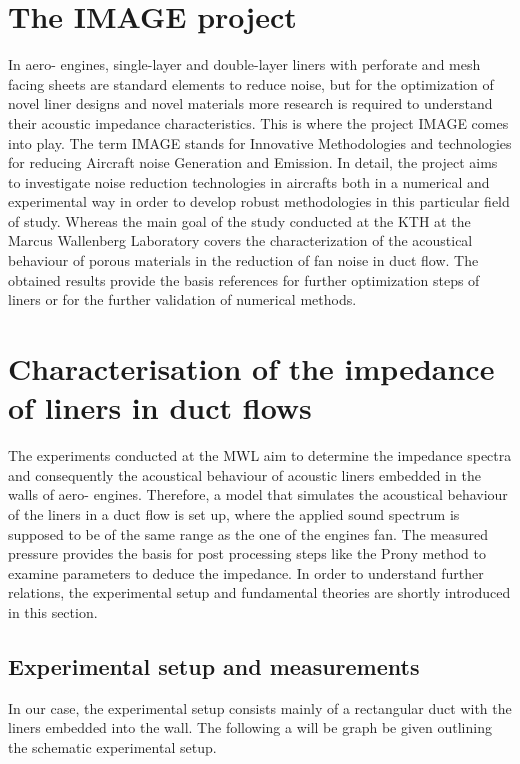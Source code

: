 \documentclass[11pt]{report} %
\begin{document}
\section{The IMAGE project} 
In aero- engines, single-layer and double-layer liners with perforate and mesh facing sheets are standard elements to reduce noise, but for the optimization of novel liner designs and novel materials more research is required to understand their acoustic impedance characteristics.
This is where the project IMAGE comes into play.
The term IMAGE stands for Innovative Methodologies and technologies for reducing Aircraft noise Generation and Emission.
In detail, the project aims to investigate noise reduction technologies in aircrafts both in a numerical and experimental way in order to develop robust methodologies in this particular field of study.  
Whereas the main goal of the study conducted at the KTH at the Marcus Wallenberg Laboratory covers the characterization of the acoustical behaviour of porous materials in the reduction of fan noise in duct flow. 
The obtained results provide the basis references for further optimization steps of liners or for the further validation of numerical methods. 

\section{Characterisation of the impedance of liners in duct flows}
The experiments conducted at the MWL aim to determine the impedance spectra and consequently the acoustical behaviour of acoustic liners embedded in the walls of aero- engines.
Therefore, a model that simulates the acoustical behaviour of the liners in a duct flow is set up, where the applied sound spectrum is supposed to be of the same range as the one of the engines fan.  
The measured pressure provides the basis for post processing steps like the Prony method to examine parameters to deduce the impedance.
In order to understand further relations, the experimental setup and fundamental theories are shortly introduced in this section. 


\subsection{Experimental setup and measurements}
In our case, the experimental setup consists mainly of a rectangular duct with the liners embedded into the wall.
The following a will be graph be given outlining the schematic experimental setup.  
\end{document}
